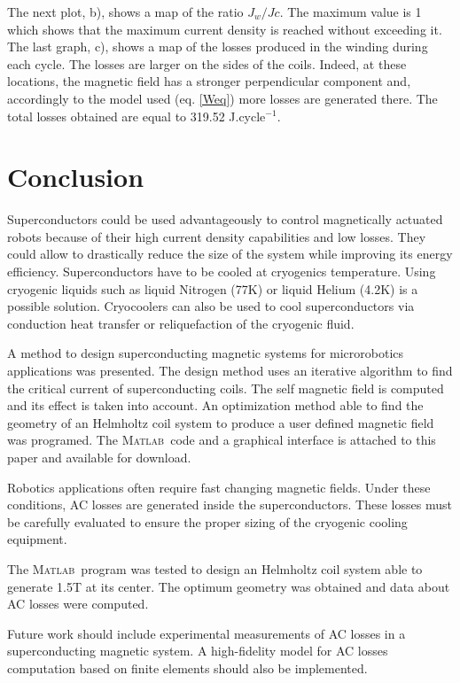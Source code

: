 \documentclass{ws-jmrr}
\newcommand{\MATLAB}{\textsc{Matlab}}
\begin{document}
\begin{multicols}{2}
\begin{figurehere}
\begin{center}
	\label{Results}
	\vspace{-0.5cm}
	\caption{Results from the geometric optimization of a superconducting Helmhotz coil system using the \MATLAB ~program provided with this paper.}
	\end{center}
\end{figurehere}
\vspace{-0.5cm}
The next plot, b), shows a map of the ratio $J_w/Jc$. The maximum value is 1 which shows that the maximum current density is reached without exceeding it. The last graph, c), shows a map of the losses produced in the winding during each cycle. The losses are larger on the sides of the coils. Indeed, at these locations, the magnetic field has a stronger perpendicular component and, accordingly to the model used (eq. \ref{Weq}) more losses are generated there. The total losses obtained are equal to 319.52 J.cycle$^{-1}$.

\section{Conclusion}
Superconductors could be used advantageously to control magnetically actuated robots because of their high current density capabilities and low losses. They could allow to drastically reduce the size of the system while improving its energy efficiency. Superconductors have to be cooled at cryogenics temperature. Using cryogenic liquids such as liquid Nitrogen (77K) or liquid Helium (4.2K) is a possible solution. Cryocoolers can also be used to cool superconductors via conduction heat transfer or reliquefaction of the cryogenic fluid.\par 
A method to design superconducting magnetic systems for microrobotics applications was presented. The design method uses an iterative algorithm to find the critical current of superconducting coils. The self magnetic field is computed and its effect is taken into account. An optimization method able to find the geometry of an Helmholtz coil system to produce a user defined magnetic field was programed. The \MATLAB ~code and a graphical interface is attached to this paper and available for download.\par
Robotics applications often require fast changing magnetic fields. Under these conditions, AC losses are generated inside the superconductors. These losses must be carefully evaluated to ensure the proper sizing of the cryogenic cooling equipment.\par
The \MATLAB ~program was tested to design an Helmholtz coil system able to generate 1.5T at its center. The optimum geometry was obtained and data about AC losses were computed.\par
Future work should include experimental measurements of AC losses in a superconducting magnetic system. A high-fidelity model for AC losses computation based on finite elements should also be implemented.





\end{multicols} 
\end{document}
